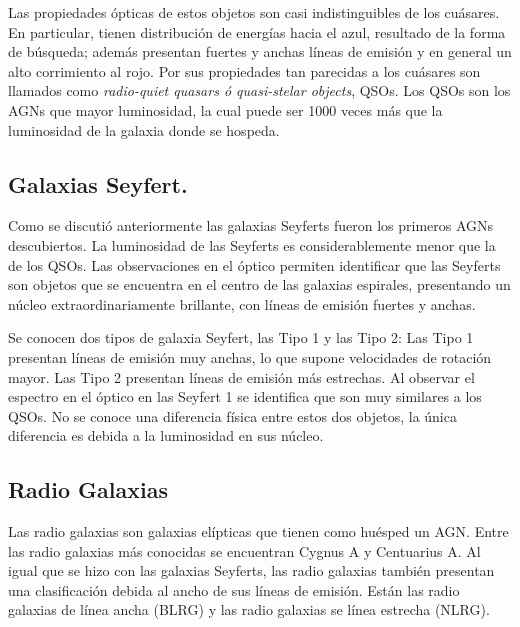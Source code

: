 Las propiedades ópticas de estos objetos son casi indistinguibles de los cuásares. En particular, tienen distribución de energías hacia el azul, resultado de la forma de búsqueda; además presentan fuertes y anchas líneas de emisión y en general un alto corrimiento al rojo. Por sus propiedades tan parecidas a los cuásares son llamados como {\textit{radio-quiet quasars ó quasi-stelar objects}}, QSOs. Los QSOs son los AGNs que mayor luminosidad, la cual puede ser 1000 veces más que la luminosidad de la galaxia donde se hospeda.

	\subsection{Galaxias Seyfert.}
	\label{subsec:Seyfert_Galaxy}

Como se discutió anteriormente las galaxias Seyferts fueron los primeros AGNs descubiertos. La luminosidad de las Seyferts es considerablemente menor que la de los QSOs. Las observaciones en el óptico permiten identificar que las Seyferts son objetos que se encuentra en el centro de las galaxias espirales, presentando un núcleo extraordinariamente brillante, con líneas de emisión  fuertes y anchas.

Se conocen dos tipos de galaxia Seyfert, las Tipo 1 y las Tipo 2: Las Tipo 1 presentan líneas de emisión muy anchas, lo que supone velocidades de rotación mayor. Las Tipo 2 presentan líneas de emisión más estrechas. Al observar el espectro en el óptico en las Seyfert 1 se identifica que son muy similares a los QSOs. No se conoce una diferencia física entre estos dos objetos, la única diferencia es debida a la luminosidad en sus núcleo. 


	\subsection{Radio Galaxias}
	\label{subsec:Radio_Galaxy}

Las radio galaxias son galaxias elípticas que tienen como huésped un AGN. Entre las radio galaxias más conocidas se encuentran Cygnus A y Centuarius A. Al igual que se hizo con las galaxias Seyferts, las radio galaxias también presentan una clasificación debida al ancho de sus  líneas de emisión. Están las radio galaxias de línea ancha (BLRG) y las radio galaxias se línea estrecha (NLRG).

